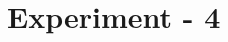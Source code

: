 \documentclass[11pt]{book}
\begin{document}

 

 


\newpage
 \thispagestyle{empty}
\renewcommand{\thesisdedication}{{\large Copyright \copyright~~ The LNMIIT 2018\\}{\large All Rights Reserved\\}}
\thesisdedicationpage


\tableofcontents

\setcounter{chapter}{3}
\chapter{Experiment - 4}
\label{ch:ex4}


% 

% 

% 






\end{document}

